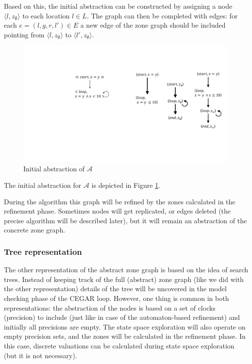 Based on this, the initial abstraction can be constructed by assigning a node $\langle l, z_{\emptyset} \rangle$ to each location $l \in L$. The graph can then be completed with edges: for each $e=(l,g,r,l') \in E$ a new edge of the zone graph should be included pointing from $\langle l, z_{\emptyset} \rangle$ to $\langle l', z_{\emptyset} \rangle$.

\begin{figure}
	\centering
	\includegraphics[width=.2\textwidth]{include/figures/graph_init}
	\caption{Initial abstraction of $\mathcal{A}$}
	\label{fig:graphinit}
\end{figure}

\begin{runningExample}
	The initial abstraction for $\mathcal{A}$ is depicted in Figure \ref{fig:graphinit}.
\end{runningExample}

During the algorithm this graph will be refined by the zones calculated in the refinement phase. Sometimes nodes will get replicated, or edges deleted (the precise algorithm will be described later), but it will remain  an abstraction of the concrete zone graph. 



 

\subsubsection{Tree representation}
The other representation of the abstract zone graph is based on the idea of search trees. Instead of keeping track of the full (abstract) zone graph (like we did with the other representation) details of the tree will be uncovered in the model checking phase of the CEGAR loop. However, one thing is common in both representations:  the abstraction of the nodes is based on a set of clocks (precision) to include (just like in case of the automaton-based refinement) and initially all precisions are empty. The state space exploration will also operate on empty precision sets, and the zones will be calculated in the refinement phase. In this case, discrete valuations can be calculated during state space exploration (but it is not necessary).

